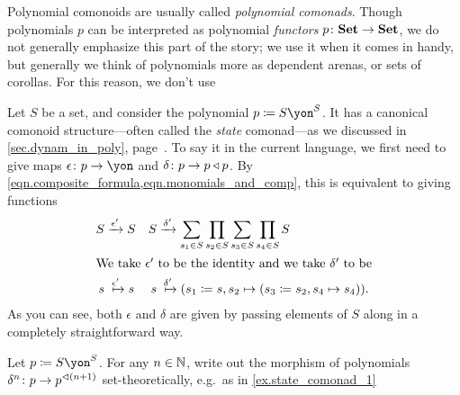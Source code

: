 \documentclass[DynamicalBook]{subfiles}
\begin{document}
Polynomial comonoids are usually called \emph{polynomial comonads}. Though polynomials $p$ can be interpreted as polynomial \emph{functors} $p\colon\textbf{Set}\to\textbf{Set}$, we do not generally emphasize this part of the story; we use it when it comes in handy, but generally we think of polynomials more as dependent arenas, or sets of corollas. For this reason, we don't use 

\begin{example}\label{ex.state_comonad_1}
Let $S$ be a set, and consider the polynomial $p\coloneqq S\yon^S$. It has a canonical comonoid structure---often called the \emph{state} comonad---as we discussed in \cref{sec.dynam_in_poly}, page~\pageref{page.poly_comonad}. To say it in the current language, we first need to give maps $\epsilon\colon p\to \yon$ and $\delta\colon p\to p\mathbin{\triangleleft} p$. By \cref{eqn.composite_formula,eqn.monomials_and_comp}, this is equivalent to giving functions
\begin{align}\nonumber
	S&\To{\epsilon'} S&
	S&\To{\delta'}\sum_{s_1\in S}\prod_{s_2\in S}\sum_{s_3\in S}\prod_{s_4\in S}S\\
\intertext{We take $\epsilon'$ to be the identity and we take $\delta'$ to be}
	s&\Mapsto{\epsilon'} s&
  s&\Mapsto{\delta'} (s_1\coloneqq s, s_2\mapsto (s_3\coloneqq s_2, s_4\mapsto s_4)).\label{eqn.state_comonoid_eps_del}
\end{align}
As you can see, both $\epsilon$ and $\delta$ are given by passing elements of $S$ along in a completely straightforward way.
\end{example}

\begin{exercise}
Let $p\coloneqq S\yon^S$. For any $n\in\mathbb{N}$, write out the morphism of polynomials $\delta^n\colon p\to p^{\lhd (n+1)}$ set-theoretically, e.g.\ as in \cref{ex.state_comonad_1}
\end{exercise}
\end{document}
